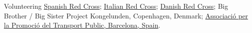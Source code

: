 \begin{paracol}{2}
  Volunteering
\switchcolumn
  \href{https://www.cruzroja.es/}{Spanish Red Cross};
  \href{https://www.cri.it}{Italian Red Cross};
  \href{https://www.rodekors.dk/}{Danish Red Cross};
  Big Brother / Big Sister Project Kongelunden, Copenhagen, Denmark;
  \href{https://transportpublic.org/}{Associació per la Promoció del Transport Public, Barcelona, Spain}.
\end{paracol}